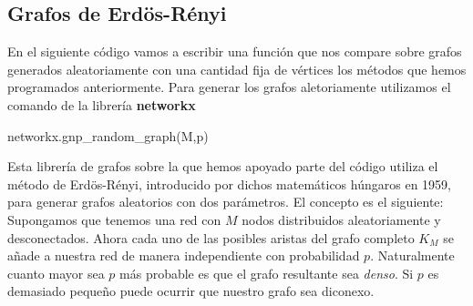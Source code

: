 \documentclass[twoside,a4paper,openright,12pt]{book}
\begin{document}
\subsection{Grafos de Erdös-Rényi}
En el siguiente código vamos a escribir una función que nos compare sobre grafos generados aleatoriamente con una cantidad fija de vértices los métodos que hemos programados anteriormente. Para generar los grafos aletoriamente utilizamos el comando de la librería \textbf{networkx}\\
\begin{pythone}
networkx.gnp_random_graph(M,p)
\end{pythone}
Esta librería de grafos sobre la que hemos apoyado parte del código utiliza el método de Erdös-Rényi, introducido por dichos matemáticos húngaros en 1959, para generar grafos aleatorios con dos parámetros. El concepto es el siguiente: Supongamos que tenemos una red con $M$ nodos distribuidos aleatoriamente y desconectados. Ahora cada uno de las posibles aristas del grafo completo $K_M$ se añade a nuestra red de manera independiente con probabilidad $p$. Naturalmente cuanto mayor sea $p$ más probable es que el grafo resultante sea \textit{denso}. Si $p$ es demasiado pequeño puede ocurrir que nuestro grafo sea diconexo. 
\end{document}
